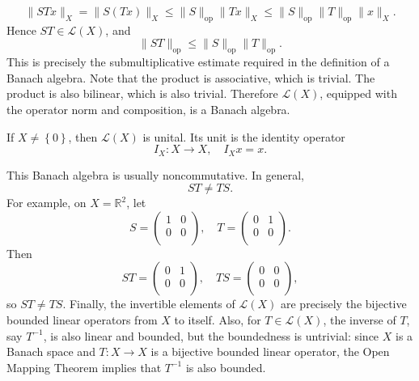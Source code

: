 \begin{eg}
\begin{enumerate}
        \[
            \lVert S T x \rVert_X = \lVert S (Tx) \rVert_X \le \lVert S \rVert_{\mathrm{op} } \lVert T x \rVert_X \le \lVert S \rVert_{\mathrm{op} } \lVert T \rVert_{\mathrm{op} } \lVert x \rVert_X.       
        \]     
        Hence \(S T \in \mathcal{L} (X)\), and 
        \[
            \lVert S T \rVert_{\mathrm{op} } \le \lVert S \rVert_{\mathrm{op} } \lVert T \rVert_{\mathrm{op} }.   
        \] 
        This is precisely the submultiplicative estimate required in the definition of a Banach algebra. Note that the product is associative, which is trivial. The product is also bilinear, which is also trivial. Therefore \(\mathcal{L} (X)\), equipped with the operator norm and composition, is a Banach algebra. 

        If \(X \neq \left\{ 0 \right\} \), then \(\mathcal{L} (X)\) is unital. Its unit is the identity operator 
        \[
            I_X : X \to X, \quad I_X x = x . 
        \]   

        This Banach algebra is usually noncommutative. In general, 
        \[
            S T \neq T S.
        \]
        For example, on \(X = \mathbb{R} ^2\), let 
        \[
            S = \begin{pmatrix}
                1 & 0  \\
                0 & 0  \\
            \end{pmatrix}, \quad T = \begin{pmatrix}
                0 & 1  \\
                0 & 0 \\
            \end{pmatrix}.
        \] 
        Then 
        \[
            ST = \begin{pmatrix}
                0 & 1  \\
                0 & 0  \\
            \end{pmatrix}, \quad TS = \begin{pmatrix}
                0 & 0  \\
                0 & 0  \\
            \end{pmatrix},
        \]
        so \(S T \neq T S\). Finally, the invertible elements of \(\mathcal{L} (X)\) are precisely the bijective bounded linear operators from \(X\) to itself. 
        Also, for \(T \in \mathcal{L} (X)\), the inverse of \(T\), say \(T^{-1}\), is also linear and bounded, but the boundedness is untrivial: since \(X\) is a Banach space and \(T: X \to X\) is a bijective bounded linear operator, the Open Mapping Theorem implies that \(T^{-1}\) is also bounded. 


\end{enumerate}
\end{eg}
